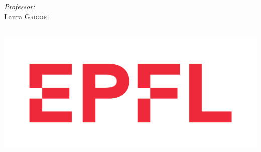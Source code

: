 \begin{titlepage}
\begin{minipage}{0.4\textwidth}
\begin{flushright}
    \emph{Professor:} \\
    Laura \textsc{Grigori
     }\\
    \end{flushright}
    \end{minipage}\\[10cm]
    
    
    
    \includegraphics[width=0.4\linewidth]{Logo-1 .pdf}\\[1cm] 
     
    
    \vfill %
    
    \end{titlepage}